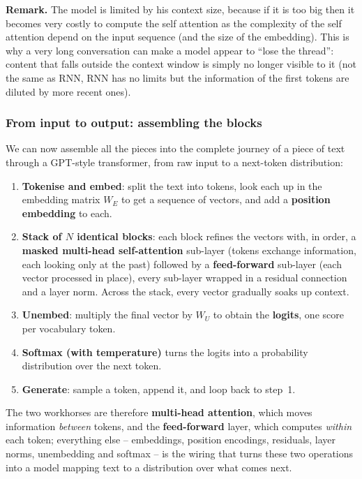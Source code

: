 \textbf{Remark.} The model is limited by his context size, because if it is too big then it becomes very costly to compute the self attention
as the complexity of the self attention depend on the input sequence (and the size of the embedding).
This is why a very long conversation can make a model appear to ``lose the thread'': content that falls outside the context window is
simply no longer visible to it (not the same as RNN, RNN has no limits but the information of the first tokens are diluted by more recent ones).

\subsubsection{From input to output: assembling the blocks}
We can now assemble all the pieces into the complete journey of a piece of text through a
GPT-style transformer, from raw input to a next-token distribution:
\begin{enumerate}
  \item \textbf{Tokenise and embed}: split the text into tokens, look each up in the embedding
        matrix $W_{E}$ to get a sequence of vectors, and add a \textbf{position embedding} to
        each.
  \item \textbf{Stack of $N$ identical blocks}: each block refines the vectors with, in order,
        a \textbf{masked multi-head self-attention} sub-layer (tokens exchange information,
        each looking only at the past) followed by a \textbf{feed-forward} sub-layer (each
        vector processed in place), every sub-layer wrapped in a residual connection and a
        layer norm. Across the stack, every vector gradually soaks up context.
  \item \textbf{Unembed}: multiply the final vector by $W_{U}$ to obtain the \textbf{logits},
        one score per vocabulary token.
  \item \textbf{Softmax (with temperature)} turns the logits into a probability distribution
        over the next token.
  \item \textbf{Generate}: sample a token, append it, and loop back to step~1.
\end{enumerate}
The two workhorses are therefore \textbf{multi-head attention}, which moves information
\emph{between} tokens, and the \textbf{feed-forward} layer, which computes \emph{within} each
token; everything else -- embeddings, position encodings, residuals, layer norms, unembedding
and softmax -- is the wiring that turns these two operations into a model mapping text to a
distribution over what comes next.

